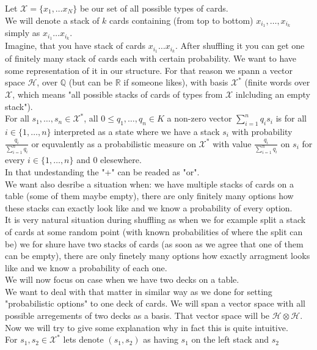 \documentclass[a4paper, 12pt]{report}
\begin{document}
Let $\mathcal{X} = \{x_1, \dots x_N\}$ be our set of all possible types of cards. \\
We will denote a stack of $k$ cards containing (from top to bottom) $x_{i_1}, \dots, x_{i_k}$ simply as 
$x_{i_1}\dots x_{i_k}$. \\
Imagine, that you have stack of cards $x_{i_1}\dots x_{i_k}$. After shuffling it
you can get one of finitely many stack of cards each with certain probability. We want to have some
representation of it in our structure. 
For that reason we spann a vector space $\mathcal{H}$, over $\mathbb{Q}$ (but can be $\mathbb{R}$ if someone 
likes), 
with basis $\mathcal{X}^*$ (finite words over $\mathcal{X}$, which means "all possible stacks 
of cards of types from $\mathcal{X}$ inlcluding an empty stack"). \\
For all $s_1, \dots, s_n \in \mathcal{X}^*$, all $0 \leq q_1, \dots, q_n \in K$ a non-zero vector 
$\displaystyle\sum^{n}_{i = 1} q_is_i$ is for all $i \in \{1, \dots, n\}$ 
interpreted as a state where we have a stack $s_i$ with probability $\frac{q_i}{\sum^n_{i=1} q_i}$ or 
equvalently as a probabilistic measure on $\mathcal{X}^*$ with value $\frac{q_i}{\sum^n_{i=1} q_i}$ on $s_i$ 
for every $i \in \{1, \dots, n\}$ and $0$ elesewhere. \\
In that undestanding the "+" can be readed as "or". \\
We want also desribe a situation when: we have multiple stacks of cards on a table (some of them maybe 
empty), there are only finitely many options how 
these stacks can exactly look like and we know a probability of every option.\\ 
It is very natural situation during shuffling as when we for example split a stack of cards at some 
random point (with known probabilities of where the split can be) 
we for shure have two stacks of cards (as soon as we agree that one of them can be empty), 
there are only finetely many options how exactly arragment looks like and we know a probability of each one. 
\\ We will now focus on case when we have two decks on a table. \\
We want to deal with that matter in similar way as we done for setting "probabilistic options" to one deck 
of cards. We will span a vector space with all possible arregements of two decks as a basis. 
That vector space will be $\mathcal{H} \otimes \mathcal{H}$. Now we will try to give some explanation why in 
fact this is quite intuitive.  \\
For $s_1, s_2 \in \mathcal{X}^*$ lets denote $(s_1, s_2)$ as having $s_1$ on the left stack and $s_2$ 
\end{document}

